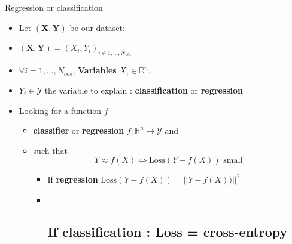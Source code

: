 \documentclass[
  ignorenonframetext,
]{beamer}
\begin{document}
\begin{frame}{Regression or classification}
\protect\hypertarget{regression-or-classification}{}
\begin{itemize}
\item
  Let \((\mathbf{X},\mathbf{Y})\) be our dataset:
\item
  \((\mathbf{X},\mathbf{Y})=(X_i, Y_i)_{i \in 1, \dots,N_{obs}}\)
\item
  \(\forall i =1,\dots,N_{obs}\), \textbf{Variables}
  \(X_i \in \mathbb{R}^n\).\\
\item
  \(Y_i \in \mathcal{Y}\) the variable to explain :
  \textbf{classification} or \textbf{regression}
\item
  Looking for a function \(f\)

  \begin{itemize}
  \item
    \textbf{classifier} or \textbf{regression}
    \(f :\mathbb{R}^n \mapsto \mathcal{Y}\) and
  \item
    such that
    \[Y \approx f(X) \Leftrightarrow \mbox{Loss}(Y -   f(X)) \mbox{ small } \]

    \begin{itemize}
    \item
      If \textbf{regression}
      \(\mbox{Loss}(Y - f(X)) = ||Y - f(X)) ||^2\)
    \item ~
      \hypertarget{if-classification-loss-cross-entropy}{%
      \subsection{\texorpdfstring{If \textbf{classification} : Loss =
      cross-entropy}{If classification : Loss = cross-entropy}}\label{if-classification-loss-cross-entropy}}
    \end{itemize}
  \end{itemize}
\end{itemize}
\end{frame}
\end{document}
